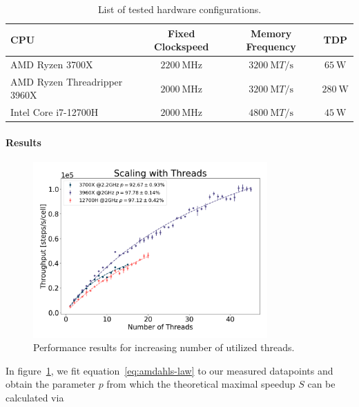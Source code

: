 \documentclass[fontsize=11pt,a4paper]{article}
\begin{document}
\begin{table}
    \centering
    \begin{tabular}{l c c c}
        CPU & Fixed Clockspeed & Memory Frequency & TDP\\
        \hline
        AMD Ryzen 3700X~\cite{AMDProductSpecifications} & $\SI{2200}{\mega\hertz}$
            & $\SI{3200}{\mega T\per\second}$ & $\SI{65}{\watt}$\\
        AMD Ryzen Threadripper 3960X~\cite{AMDProductSpecifications} & $\SI{2000}{\mega\hertz}$
            & $\SI{3200}{\mega T\per\second}$ & $\SI{280}{\watt}$\\
        Intel Core i7-12700H~\cite{Inteli712700H} & $\SI{2000}{\mega\hertz}$
            & $\SI{4800}{\mega T\per\second}$
            & $\SI{45}{\watt}$\\
    \end{tabular}
    \caption{List of tested hardware configurations.}
    \label{tab:hardware-configurations}
\end{table}

\paragraph{Results}

\begin{figure}
    \centering
    \includegraphics[width=0.8\textwidth]{figures/thread_scaling.png}
    \caption{Performance results for increasing number of utilized threads.}
    \label{fig:amdahls-law-fit}
\end{figure}

In figure~\ref{fig:amdahls-law-fit}, we fit equation~\ref{eq:amdahls-law} to our measured datapoints
and obtain the parameter $p$ from which the theoretical maximal speedup $S$ can be calculated via
\end{document}

